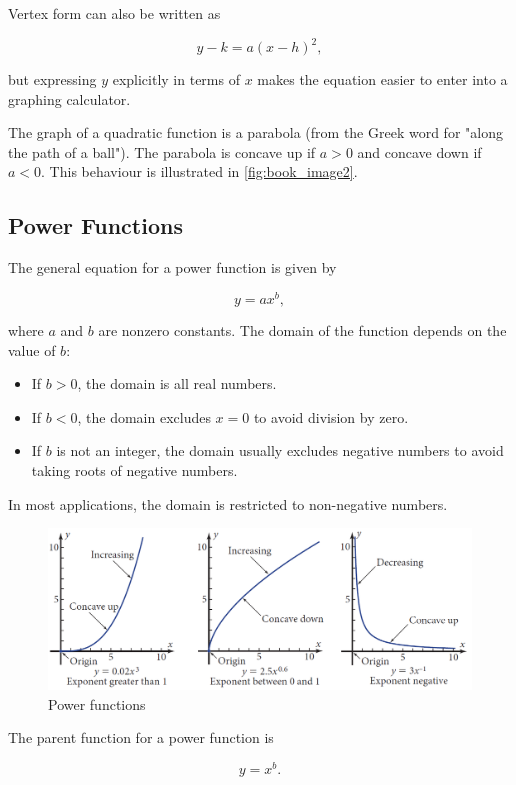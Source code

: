 Vertex form can also be written as

\[
y - k = a(x-h)^2,
\]

but expressing \(y\) explicitly in terms of \(x\) makes the equation easier to enter into a graphing calculator.

The graph of a quadratic function is a parabola (from the Greek word for "along the path of a ball"). The parabola is concave up if \(a > 0\) and concave down if \(a < 0\). This behaviour is illustrated in \autoref{fig:book_image2}.

\subsection*{Power Functions}
The general equation for a power function is given by

\[
y = ax^b,
\]

where \(a\) and \(b\) are nonzero constants. The domain of the function depends on the value of \(b\):
\begin{itemize}
    \item If \(b > 0\), the domain is all real numbers.
    \item If \(b < 0\), the domain excludes \(x = 0\) to avoid division by zero.
    \item If \(b\) is not an integer, the domain usually excludes negative numbers to avoid taking roots of negative numbers.
\end{itemize}
In most applications, the domain is restricted to non-negative numbers.

\begin{figure}[htbp]
    \centering
    \includegraphics[width=1\textwidth]{figure/book3.png} %
    \caption{Power functions}
    \label{fig:book_image3}
\end{figure}

The parent function for a power function is

\[
y = x^b.
\]

